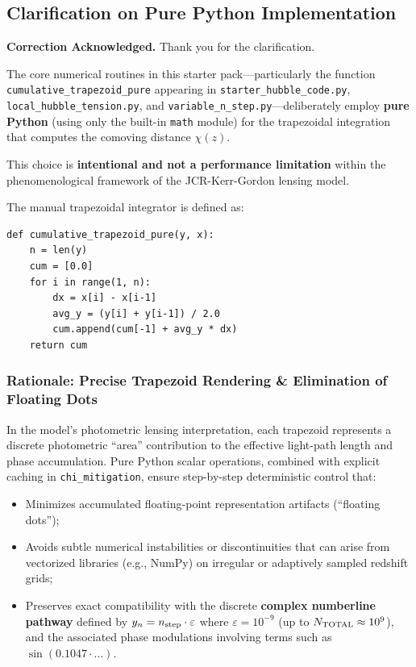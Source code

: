 \subsection*{Clarification on Pure Python Implementation}

\textbf{Correction Acknowledged.} Thank you for the clarification.

The core numerical routines in this starter pack---particularly the function \texttt{cumulative\_trapezoid\_pure} appearing in \texttt{starter\_hubble\_code.py}, \texttt{local\_hubble\_tension.py}, and \texttt{variable\_n\_step.py}---deliberately employ \textbf{pure Python} (using only the built-in \texttt{math} module) for the trapezoidal integration that computes the comoving distance \( \chi(z) \).

This choice is \textbf{intentional and not a performance limitation} within the phenomenological framework of the JCR-Kerr-Gordon lensing model. 

The manual trapezoidal integrator is defined as:
\begin{verbatim}
def cumulative_trapezoid_pure(y, x):
    n = len(y)
    cum = [0.0]
    for i in range(1, n):
        dx = x[i] - x[i-1]
        avg_y = (y[i] + y[i-1]) / 2.0
        cum.append(cum[-1] + avg_y * dx)
    return cum
\end{verbatim}

\subsubsection*{Rationale: Precise Trapezoid Rendering \& Elimination of Floating Dots}

In the model's photometric lensing interpretation, each trapezoid represents a discrete photometric ``area'' contribution to the effective light-path length and phase accumulation. Pure Python scalar operations, combined with explicit caching in \texttt{chi\_mitigation}, ensure step-by-step deterministic control that:

\begin{itemize}
    \item Minimizes accumulated floating-point representation artifacts (``floating dots'');
    \item Avoids subtle numerical instabilities or discontinuities that can arise from vectorized libraries (e.g., NumPy) on irregular or adaptively sampled redshift grids;
    \item Preserves exact compatibility with the discrete \textbf{complex numberline pathway} defined by \( y_n = n_{\rm step} \cdot \varepsilon \) where \( \varepsilon = 10^{-9} \) (up to \( N_{\rm TOTAL} \approx 10^9 \)), and the associated phase modulations involving terms such as \( \sin(0.1047 \cdot \ldots) \).
\end{itemize}

